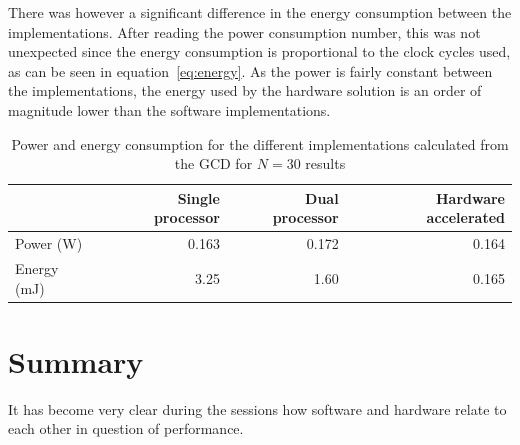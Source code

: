 \documentclass[11pt]{article}
\begin{document}
There was however a significant difference in the energy consumption between the implementations. After reading the power consumption number, this was not unexpected since the energy consumption is proportional to the clock cycles used, as can be seen in equation~\eqref{eq:energy}. As the power is fairly constant between the implementations, the energy used by the hardware solution is an order of magnitude lower than the software implementations.

\begin{table}[htbp]
  \centering
  \begin{tabular}{lrrr}
    \toprule
    & Single processor  & Dual processor    & Hardware accelerated\\
    \midrule
    Power (W)   & 0.163         & 0.172         & 0.164\\

    Energy (mJ) & 3.25       & 1.60     & 0.165\\
    \bottomrule
  \end{tabular}
  \caption{Power and energy consumption for the different implementations calculated from the GCD for $N=30$ results}
  \label{tab:Power}
\end{table}

\section{Summary\label{sec:summary}}
It has become very clear during the sessions how software and hardware relate to each other in question of performance.

\printbibliography
\end{document}
